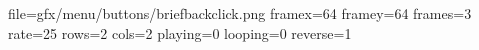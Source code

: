 file=gfx/menu/buttons/briefbackclick.png
framex=64
framey=64
frames=3
rate=25
rows=2
cols=2
playing=0
looping=0
reverse=1
